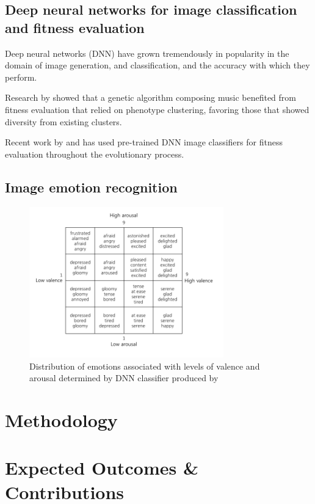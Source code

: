 \documentclass{article}
\begin{document}
	\subsection{Deep neural networks for image classification and fitness evaluation}
	Deep neural networks (DNN) have grown tremendously in popularity in the domain of image generation, and classification, and the accuracy with which they perform.
	
	Research by \citet{burton1998genetic} showed that a genetic algorithm composing music benefited from fitness evaluation that relied on phenotype clustering, favoring those that showed diversity from existing clusters.
	
	Recent work by \citet{nguyen2015deep} and \citet{nguyen2015innovation} has used pre-trained DNN image classifiers for fitness evaluation throughout the evolutionary process.
	
	\subsection{Image emotion recognition}
	
	\begin{figure}[h!]
		\includegraphics[width=0.75\textwidth]{images/valence-arousal-grid.png}
		\caption{Distribution of emotions associated with levels of valence and arousal determined by DNN classifier produced by \citet{kim2018building}}
		\label{fig:valence-arousal}
	\end{figure}
	
	\section{Methodology}
	
	
	\section{Expected Outcomes \& Contributions}
	
	
	
	
	
\end{document}
